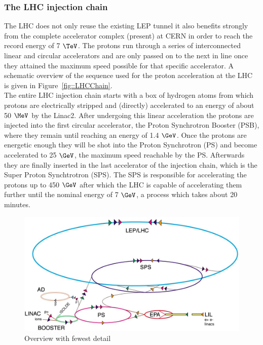 \subsubsection{The LHC injection chain}
The LHC does not only reuse the existing LEP tunnel it also benefits strongly from the complete accelerator complex (present) at CERN in order to reach the record energy of 7 $\TeV$. 
The protons run through a series of interconnected linear and circular accelerators and are only passed on to the next in line once they attained the maximum speed possible for that specific accelerator. A schematic overview of the sequence used for the proton acceleration at the LHC is given in Figure~\ref{fig::LHCChain}.\\
The entire LHC injection chain starts with a box of hydrogen atoms from which protons are electrically stripped and (directly) accelerated to an energy of about 50 $\MeV$ by the Linac2.
After undergoing this linear acceleration the protons are injected into the first circular accelerator, the Proton Synchrotron Booster (PSB), where they remain until reaching an energy of 1.4 $\GeV$.
Once the protons are energetic enough they will be shot into the Proton Synchrotron (PS) and become accelerated to 25 $\GeV$, the maximum speed reachable by the PS.
Afterwards they are finally inserted in the last accelerator of the injection chain, which is the Super Proton Synchtrotron (SPS).
The SPS is responsible for accelerating the protons up to 450 $\GeV$ after which the LHC is capable of accelerating them further until the nominal energy of 7 $\GeV$, a process which takes about 20 minutes.
\begin{figure}[h!t]
 \centering
 \includegraphics[width = 0.8 \textwidth]{Chapters/Chapter2_CERN/Figures/CERNAcceleratorComplex_Few.jpg}
 \caption{Overview with fewest detail}
\end{figure}

